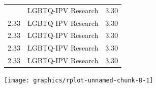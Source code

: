 \documentclass[]{tufte-handout}
\begin{document}
\begin{longtable}[]{@{}lll@{}}
\begin{minipage}[t]{0.09\columnwidth}
\end{minipage} & \begin{minipage}[t]{0.27\columnwidth}\raggedright\strut
LGBTQ-IPV Research\strut
\end{minipage} & \begin{minipage}[t]{0.08\columnwidth}\raggedright\strut
3.30\strut
\end{minipage}\tabularnewline
\begin{minipage}[t]{0.09\columnwidth}\raggedright\strut
2.33\strut
\end{minipage} & \begin{minipage}[t]{0.27\columnwidth}\raggedright\strut
LGBTQ-IPV Research\strut
\end{minipage} & \begin{minipage}[t]{0.08\columnwidth}\raggedright\strut
3.30\strut
\end{minipage}\tabularnewline
\begin{minipage}[t]{0.09\columnwidth}\raggedright\strut
2.33\strut
\end{minipage} & \begin{minipage}[t]{0.27\columnwidth}\raggedright\strut
LGBTQ-IPV Research\strut
\end{minipage} & \begin{minipage}[t]{0.08\columnwidth}\raggedright\strut
3.30\strut
\end{minipage}\tabularnewline
\begin{minipage}[t]{0.09\columnwidth}\raggedright\strut
2.33\strut
\end{minipage} & \begin{minipage}[t]{0.27\columnwidth}\raggedright\strut
LGBTQ-IPV Research\strut
\end{minipage} & \begin{minipage}[t]{0.08\columnwidth}\raggedright\strut
3.30\strut
\end{minipage}\tabularnewline
\begin{minipage}[t]{0.09\columnwidth}\raggedright\strut
2.33\strut
\end{minipage} & \begin{minipage}[t]{0.27\columnwidth}\raggedright\strut
LGBTQ-IPV Research\strut
\end{minipage} & \begin{minipage}[t]{0.08\columnwidth}\raggedright\strut
3.30\strut
\end{minipage}\tabularnewline
\bottomrule
\end{longtable}

\texttt{[image: graphics/rplot-unnamed-chunk-8-1]}
\end{document}
